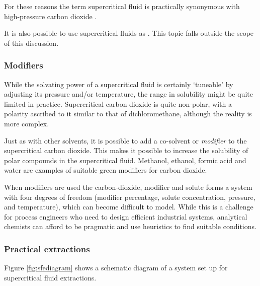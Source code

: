 For these reasons the term supercritical fluid is practically synonymous with
high-pressure carbon dioxide .

It is also possible to use supercritical fluids as . This topic
falls outside the scope of this discussion.
 
\subsubsection{Modifiers}

While the solvating power of a supercritical fluid is certainly `tuneable' by
adjusting its pressure and/or temperature, the range in solubility might be
quite limited in practice. Supercritical carbon dioxide is quite non-polar, with
a polarity ascribed to it similar to that of dichloromethane, although the
reality is more complex. 

Just as with other solvents, it is possible to add a co-solvent or
\textit{modifier} to the supercritical carbon dioxide. This makes it possible to
increase the solubility of polar compounds in the supercritical fluid. Methanol,
ethanol, formic acid and water are examples of suitable green modifiers for
carbon dioxide.

When modifiers are used the carbon-dioxide, modifier and solute forms a system
with four degrees of freedom (modifier percentage, solute concentration,
pressure, and temperature), which can become difficult to model. While this is a
challenge for process engineers who need to design efficient industrial systems,
analytical chemists can afford to be pragmatic and use heuristics to find
suitable conditions.

\subsubsection{Practical extractions}

Figure \ref{fig:sfediagram} shows a schematic diagram of a system set up for supercritical fluid extractions. 

